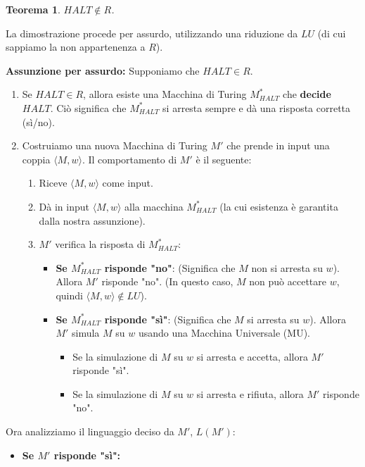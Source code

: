 \documentclass[a4paper]{article}
\makeatletter
\newtheorem{theorem}{Teorema}[section] %
\renewenvironment{proof}[1][\proofname]{\par
  \pushQED{\qed}%
  \normalfont \topsep6\p@\@plus6\p@\relax
  \trivlist
  \item[\hskip\labelsep
        \bfseries
    #1\@addpunct{.}]\ignorespaces
}{%
  \popQED\endtrivlist\@endpefalse
}
\makeatother
\begin{document}
\begin{theorem}
$HALT \notin R$.
\end{theorem}
\begin{proof}
La dimostrazione procede per assurdo, utilizzando una riduzione da $LU$ (di cui sappiamo la non appartenenza a $R$).

\textbf{Assunzione per assurdo:} Supponiamo che $HALT \in R$.
\begin{enumerate}
    \item Se $HALT \in R$, allora esiste una Macchina di Turing $M_{HALT}^*$ che \textbf{decide} $HALT$. Ciò significa che $M_{HALT}^*$ si arresta sempre e dà una risposta corretta (sì/no).
    \item Costruiamo una nuova Macchina di Turing $M'$ che prende in input una coppia $\langle M, w \rangle$. Il comportamento di $M'$ è il seguente:
    \begin{enumerate}
        \item Riceve $\langle M, w \rangle$ come input.
        \item Dà in input $\langle M, w \rangle$ alla macchina $M_{HALT}^*$ (la cui esistenza è garantita dalla nostra assunzione).
        \item $M'$ verifica la risposta di $M_{HALT}^*$:
        \begin{itemize}
            \item \textbf{Se $M_{HALT}^*$ risponde "no"}: (Significa che $M$ non si arresta su $w$). Allora $M'$ risponde "no". (In questo caso, $M$ non può accettare $w$, quindi $\langle M, w \rangle \notin LU$).
            \item \textbf{Se $M_{HALT}^*$ risponde "sì"}: (Significa che $M$ si arresta su $w$). Allora $M'$ simula $M$ su $w$ usando una Macchina Universale (MU).
            \begin{itemize}
                \item Se la simulazione di $M$ su $w$ si arresta e accetta, allora $M'$ risponde "sì".
                \item Se la simulazione di $M$ su $w$ si arresta e rifiuta, allora $M'$ risponde "no".
            \end{itemize}
        \end{itemize}
    \end{enumerate}
\end{enumerate}
Ora analizziamo il linguaggio deciso da $M'$, $L(M')$:
\begin{itemize}
    \item \textbf{Se $M'$ risponde "sì":}

\end{itemize}
\end{proof}
\end{document}
